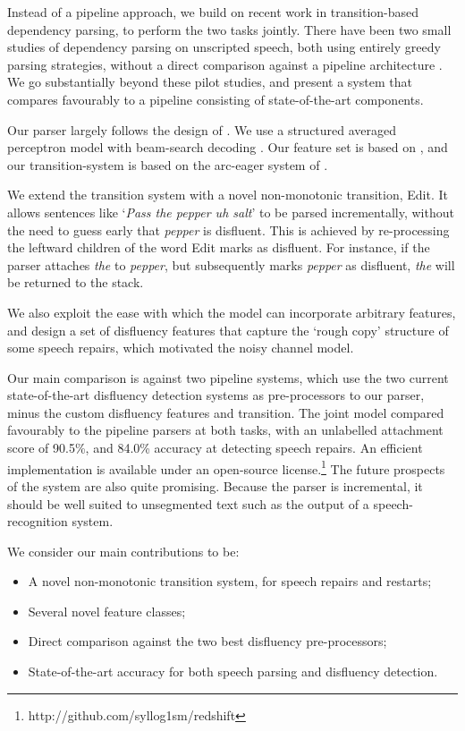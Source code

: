 \documentclass[11pt,letterpaper]{article}
\begin{document}
Instead of a pipeline approach, we build on recent work in transition-based dependency
parsing, to perform the two tasks jointly.
There have been two small studies of dependency parsing on unscripted speech,
both using entirely greedy parsing strategies, without a direct comparison
against a pipeline architecture \citep{jorgensen:07,rasooli:13}.  We go substantially
beyond these pilot studies, and present a system that compares favourably to a
pipeline consisting of state-of-the-art components.

Our parser largely follows the design of \citet{zhang:cl11}. We use a structured averaged
perceptron model with beam-search decoding \citep{collins:02}. Our feature set
is based on \citet{zhang:cl11}, and our transition-system is based on the arc-eager
system of \citet{nivre:03}.

We extend the transition system with a novel non-monotonic transition, Edit.
It allows sentences like `\emph{Pass the pepper uh salt}'
to be parsed incrementally, without the need to guess early that \emph{pepper}
is disfluent.  This is achieved by re-processing the leftward children of
the word Edit marks as disfluent.  For instance, if the parser attaches \emph{the}
to \emph{pepper}, but subsequently marks \emph{pepper} as disfluent, \emph{the} will
be returned to the stack.

We also exploit the ease with which the model can incorporate arbitrary
features, and design a set of disfluency features that capture the
`rough copy' structure of some speech repairs, which motivated the
\citet{Johnson04a} noisy channel model.

Our main comparison is against two pipeline systems, which use the two current 
state-of-the-art disfluency detection systems as pre-processors to our
parser, minus the custom disfluency features and transition.
The joint model compared favourably to the pipeline parsers at both tasks, with
an unlabelled attachment score of 90.5\%, and 84.0\% accuracy at detecting speech
repairs. An efficient implementation is available under an open-source
license.\footnote{http://github.com/syllog1sm/redshift}
The future prospects of the system are also quite promising.
Because the parser is incremental, it should be well suited to
unsegmented text such as the output of a speech-recognition system.

We consider our main contributions to be:

\begin{itemize}
    \itemsep0em
    \item A novel non-monotonic transition system, for speech repairs and restarts;
    \item Several novel feature classes;
    \item Direct comparison against the two best disfluency pre-processors;
    \item State-of-the-art accuracy for both speech parsing and disfluency detection.
\end{itemize}
\end{document}
